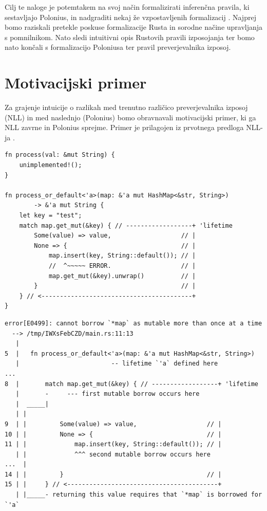 \documentclass[a4paper,12pt,openright]{book}
\begin{document}
Cilj te naloge je potemtakem na svoj način formalizirati inferenčna pravila, ki sestavljajo Polonius, in nadgraditi nekaj že vzpostavljenih formalizacij \cite{stjernaModellingRustsReference}. Najprej bomo raziskali pretekle poskuse formalizacije Rusta in sorodne načine upravljanja s pomnilnikom. Nato sledi intuitivni opis Rustovih pravili izposojanja ter bomo nato končali s formalizacijo Poloniusa ter pravil preverjevalnika izposoj.

\section{Motivacijski primer}

Za grajenje intuicije o razlikah med trenutno različico preverjevalnika izposoj (NLL) in med naslednjo (Polonius) bomo obravnavali motivacijski primer, ki ga NLL zavrne in Polonius sprejme. Primer je prilagojen iz prvotnega predloga NLL-ja \cite{2094nllRustRFC}.

\begin{listing}[ht!]
	\begin{verbatim}
fn process(val: &mut String) {
    unimplemented!();
}

fn process_or_default<'a>(map: &'a mut HashMap<&str, String>) 
        -> &'a mut String {
    let key = "test";
    match map.get_mut(&key) { // ------------------+ 'lifetime
        Some(value) => value,                   // |
        None => {                               // |
            map.insert(key, String::default()); // |
            //  ^~~~~~ ERROR.                   // |
            map.get_mut(&key).unwrap()          // |
        }                                       // |
    } // <-----------------------------------------+
}
    \end{verbatim}
	\caption{Motivacijski primer za Polonius}
	\label{listing:mot_ex}
\end{listing}

\begin{listing}[ht!]
	\begin{verbatim}
error[E0499]: cannot borrow `*map` as mutable more than once at a time
  --> /tmp/IWXsFebCZD/main.rs:11:13
   |
5  |   fn process_or_default<'a>(map: &'a mut HashMap<&str, String>) 
   |                         -- lifetime `'a` defined here
...
8  |       match map.get_mut(&key) { // ------------------+ 'lifetime
   |       -     --- first mutable borrow occurs here
   |  _____|
   | |
9  | |         Some(value) => value,                   // |
10 | |         None => {                               // |
11 | |             map.insert(key, String::default()); // |
   | |             ^^^ second mutable borrow occurs here
...  |
14 | |         }                                       // |
15 | |     } // <-----------------------------------------+
   | |_____- returning this value requires that `*map` is borrowed for `'a`
    \end{verbatim}
	\caption{Napaka pri prevajanju primera \ref{listing:mot_ex}}
	\label{listing:mot_ex_err}
\end{listing}
\end{document}
